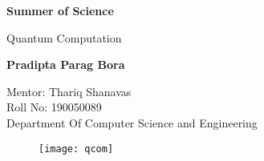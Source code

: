 \begin{titlepage}
    \begin{center}
        \vspace*{1cm}
            
        \Huge
        \textbf{Summer of Science}
            
        \vspace{0.5cm}
        \LARGE
        Quantum Computation
            
        \vspace{1.5cm}
            
        \textbf{Pradipta Parag Bora}
            
        
       
            
        \vspace{0.8cm}
            
            
        \Large
        Mentor: Thariq Shanavas \\
        Roll No: 190050089 \\
        Department Of Computer Science and Engineering
        
        \vspace{2.0cm}
        \begin{figure}[htp]
        \centering
        \texttt{[image: qcom]}
    \end{figure}
            
    \end{center}
\end{titlepage}